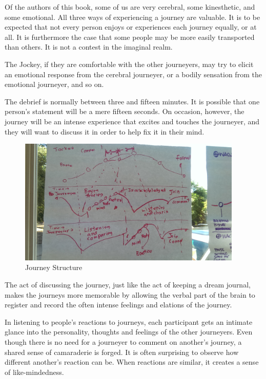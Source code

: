 \documentclass[12pt]{book}
\begin{document}
Of the authors of this book, some of us are very cerebral, some kinesthetic, and some emotional. All three ways of experiencing a journey are valuable. It is to be expected that not every person enjoys or experiences each journey equally, or at all. It is furthermore the case that some people may be more easily transported than others. It is not a contest in the imaginal realm.
					
The Jockey, if they are comfortable with the other journeyers, may try to elicit an emotional response from the cerebral journeyer, or a bodily sensation from the emotional journeyer, and so on.
					
The debrief is normally between three and fifteen minutes. It is possible that one person’s statement will be a mere fifteen seconds. On occasion, however, the journey will be an intense experience that excites and touches the journeyer, and they will want to discuss it in order to help fix it in their mind.



\begin{figure}
  \centering
     \includegraphics[width=0.95\textwidth]{WacuriFigures/JourneyerInteraction.jpg}
     \caption{Journey Structure}
  \label{fig:journeystructure}     
\end{figure}

The act of discussing the journey, just like the act of keeping a dream journal, makes the journeys more memorable by allowing the verbal part of the brain to register and record the often intense feelings and elations of the journey.
					
In listening to people’s reactions to journeys, each participant gets an intimate glance into the personality, thoughts and feelings of the other journeyers. Even though there is no need for a journeyer to comment on another’s journey, a shared sense of camaraderie is forged. It is often surprising to observe how different another’s reaction can be. When reactions are similar, it creates a sense of like-mindedness.
					
\end{document}

